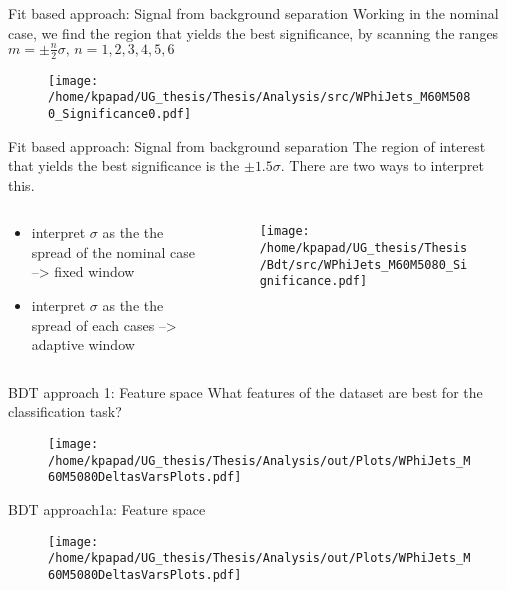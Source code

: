 \documentclass[bigger]{beamer}
\begin{document}
\begin{frame}[label={sec:org9467c4b}]{Fit based approach: Signal from background separation}
Working in the nominal case, we find the region that yields the best significance, by scanning the ranges \(m=\pm \frac{n}{2}\sigma\text{, }n=1, 2, 3, 4, 5, 6\) 
\begin{figure}[h]
\centering
\texttt{[image: /home/kpapad/UG\_thesis/Thesis/Analysis/src/WPhiJets\_M60M5080\_Significance0.pdf]}
\end{figure}
\end{frame}
\begin{frame}[label={sec:orge81c0e0}]{Fit based approach: Signal from background separation}
The region of interest that yields the best significance is the \(\pm 1.5\sigma\). There are two ways to interpret this.
\begin{columns}
\begin{column}{0.5\columnwidth}
\begin{itemize}
\item interpret \(\sigma\) as the the spread of the nominal case --> fixed window
\item interpret \(\sigma\) as the the spread of each  cases --> adaptive window
\end{itemize}
\end{column}
\begin{column}{0.5\columnwidth}
\begin{figure}[h]
\centering
\texttt{[image: /home/kpapad/UG\_thesis/Thesis/Bdt/src/WPhiJets\_M60M5080\_Significance.pdf]}
\end{figure}
\end{column}
\end{columns}
\end{frame}
\begin{frame}[label={sec:org0b374f4}]{BDT approach 1: Feature space}
\alert{What features of the dataset are best for the classification task?}
\begin{figure}[h!]
\centering
\texttt{[image: /home/kpapad/UG\_thesis/Thesis/Analysis/out/Plots/WPhiJets\_M60M5080DeltasVarsPlots.pdf]}
\end{figure}
\end{frame}
\begin{frame}[label={sec:org2c02496}]{BDT approach1a: Feature space}
\begin{figure}[h!]
\centering
\texttt{[image: /home/kpapad/UG\_thesis/Thesis/Analysis/out/Plots/WPhiJets\_M60M5080DeltasVarsPlots.pdf]}
\end{figure}
\end{frame}
\end{document}
